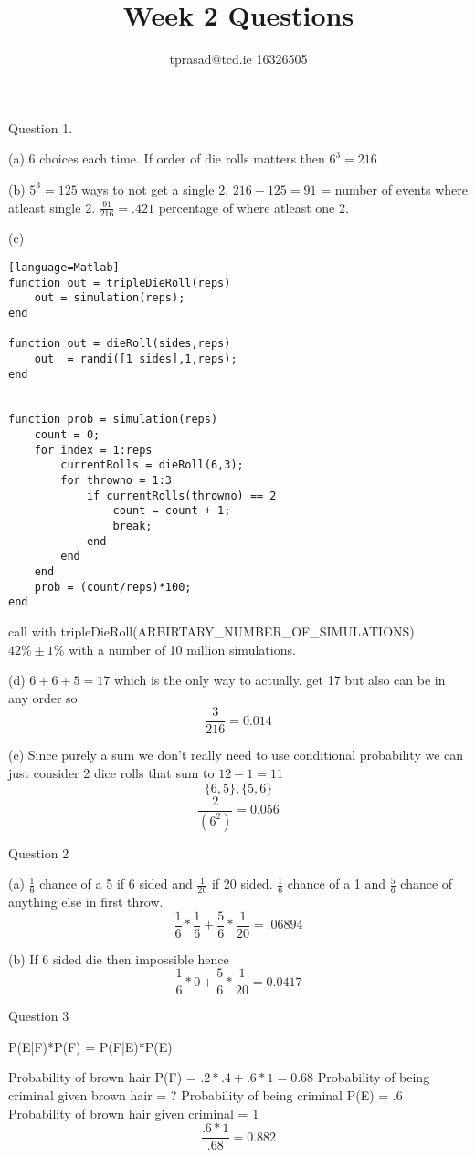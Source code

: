 \documentclass[12pt]{article}
\title{Week 2 Questions}
\author{tprasad@tcd.ie 16326505}
\begin{document}
\maketitle
\begin{flushleft}
Question 1.

(a) 6 choices each time. 
	If order of die rolls matters then $6^3= 216 $
	
(b) $5^3 = 125$ ways to not get a single 2. 
	$216 - 125 = 91$ = number of events where atleast single 2.
	$\frac{91}{216} = .421$ percentage of where atleast one 2.
		
(c)
\begin{minipage}{\textwidth}
\begin{lstlisting}[tabsize=4][language=Matlab]
function out = tripleDieRoll(reps)
	out = simulation(reps);
end

function out = dieRoll(sides,reps)
	out  = randi([1 sides],1,reps);
end


function prob = simulation(reps)
	count = 0;
	for index = 1:reps
		currentRolls = dieRoll(6,3);
		for throwno = 1:3
			if currentRolls(throwno) == 2
				count = count + 1;
				break;
			end
		end
	end
	prob = (count/reps)*100;
end
\end{lstlisting}
\end{minipage}
	
	call with tripleDieRoll(ARBIRTARY\_NUMBER\_OF\_SIMULATIONS)
	$42\% \pm 1\%$ with a number of 10 million simulations. 
		
(d) $6 + 6 + 5 = 17$ which is the only way to actually.
	get 17 but also can be in any order so
	\[\frac{3}{216} = 0.014\]
		
(e) Since purely a sum we don't really need to use conditional probability we can just consider 2 dice rolls that sum to $12-1 = 11$
	\[\{6,5\}, \{5,6\} \]
	\[\frac{2}{(6^2)} = 0.056\]
	
Question 2

(a) $ \frac{1}{6}$ chance of a 5 if 6 sided and $ \frac{1}{20}$ if 20 sided.
	$ \frac{1}{6}$ chance of a 1 and $\frac{5}{6}$ chance of anything else in first throw.
	\[\frac{1}{6}*\frac{1}{6} + \frac{5}{6}*\frac{1}{20} = .06894\]
	
(b) If 6 sided die then impossible hence
	\[\frac{1}{6}*0 + \frac{5}{6}*\frac{1}{20} =  0.0417\]


Question 3

	P(E|F)*P(F) = P(F|E)*P(E)
	
	Probability of brown hair P(F) = $.2*.4 + .6*1 = 0.68$ \newline
	Probability of being criminal given brown hair = ? \newline
	Probability of being criminal P(E) = .6 \newline
	Probability of brown hair given criminal = 1 \newline
	\[\frac{.6*1}{.68} = 0.882\]
	

\end{flushleft}
\end{document}
